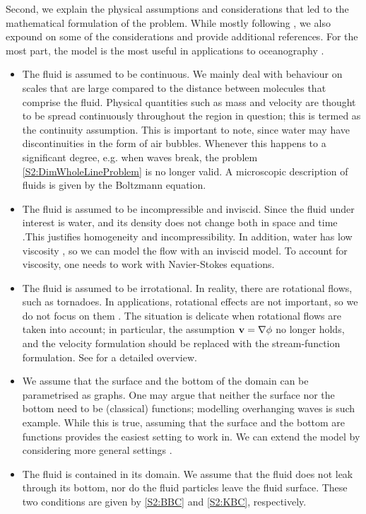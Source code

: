 Second, we explain the physical assumptions and considerations that led to the mathematical formulation of the problem. While mostly following \cite[Chapter 1]{Lannes}, we also expound on some of the considerations and provide additional references. For the most part, the model is the most useful in applications to oceanography \cite{?}.
\begin{itemize}
\item The fluid is assumed to be continuous. We mainly deal with behaviour on scales that are large compared to the distance between molecules that comprise the fluid. Physical quantities such as mass and velocity are thought to be spread continuously throughout the region in question; this is termed as the continuity assumption. This is important to note, since water may have discontinuities in the form of air bubbles. Whenever this happens to a significant degree, e.g. when waves break, the problem \eqref{S2:DimWholeLineProblem} is no longer valid. A microscopic description of fluids is given by the Boltzmann equation. 
\item The fluid is assumed to be incompressible and inviscid. Since the fluid under interest is water, and its density does not change both in space and time \cite{?}.This justifies homogeneity and incompressibility. In addition, water has low viscosity \cite{?}, so we can model the flow with an inviscid model. To account for viscosity, one needs to work with Navier-Stokes equations. 
\item The fluid is assumed to be irrotational. In reality, there are rotational flows, such as tornadoes. In applications, rotational effects are not important, so we do not focus on them \cite{?}. The situation is delicate when rotational flows are taken into account; in particular, the assumption ${\bf v} = \nabla \phi$ no longer holds, and the velocity formulation should be replaced with the stream-function formulation. See \cite[p.32]{Lannes} for a detailed overview.
\item We assume that the surface and the bottom of the domain can be parametrised as graphs. One may argue that neither the surface nor the bottom need to be (classical) functions; modelling overhanging waves is such example. While this is true, assuming that the surface and the bottom are functions provides the easiest setting to work in. We can extend the model by considering more general settings \cite{?}.
\item The fluid is contained in its domain. We assume that the fluid does not leak through its bottom, nor do the fluid particles leave the fluid surface. These two conditions are given by \eqref{S2:BBC} and \eqref{S2:KBC}, respectively.

\end{itemize}
